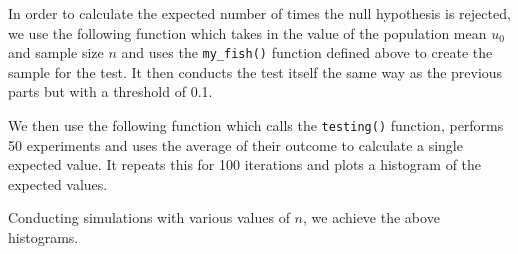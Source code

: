 \documentclass[answers]{exam}
\begin{document}
In order to calculate the expected number of times the null hypothesis is rejected, we use the following function which takes in the value of the population mean $u_0$ and sample size $n$ and uses the \texttt{my\_fish()} function defined above to create the sample for the test. It then conducts the test itself the same way as the previous parts but with a threshold of 0.1.


We then use the following function which calls the \texttt{testing()} function, performs 50 experiments and uses the average of their outcome to calculate a single expected value. It repeats this for 100 iterations and plots a histogram of the expected values.

\pagebreak
Conducting simulations with various values of $n$, we achieve the above histograms.
\begin{figure}
  \centering
  \mbox{\quad
  }
\end{figure}
\end{document}
